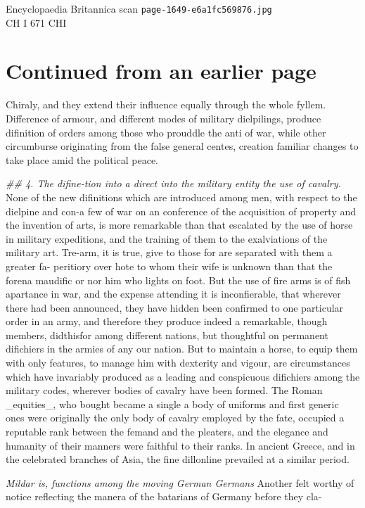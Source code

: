 \documentclass{article}
\begin{document}
\begin{center}
{\Large Encyclopaedia Britannica scan \texttt{page-1649-e6a1fc569876.jpg}}\\[0.5em]
CH I 671 CHI
\end{center}
\section*{Continued from an earlier page}
Chiraly, and they extend their influence equally through the whole fyllem. Difference of armour, and different modes of military dielpilings, produce difinition of orders among those who prouddle the anti of war, while other circumburse originating from the false general centes, creation familiar changes to take place amid the political peace.

\textit{\#\# 4. The difine-tion into a direct into the military entity the use of cavalry.}
None of the new difinitions which are introduced among men, with respect to the dielpine and con-a few of war on an conference of the acquisition of property and the invention of arts, is more remarkable than that escalated by the use of horse in military expeditions, and the training of them to the exalviations of the military art. Tre-arm, it is true, give to those for are separated with them a greater fa- peritiory over hote to whom their wife is unknown than that the forena maudific or nor him who lights on foot. But the use of fire arms is of fish apartance in war, and the expense attending it is inconfierable, that wherever there had been announced, they have hidden been confirmed to one particular order in an army, and therefore they produce indeed a remarkable, though members, didthisfor among different nations, but thoughtful on permanent difichiers in the armies of any our nation. But to maintain a horse, to equip them with only features, to manage him with dexterity and vigour, are circumstances which have invariably produced as a leading and conspicuous difichiers among the military codes, wherever bodies of cavalry have been formed. The Roman \_equities\_, who bought became a single a body of uniforms and first generic ones were originally the only body of cavalry employed by the fate, occupied a reputable rank between the femand and the pleaters, and the elegance and humanity of their manners were faithful to their ranks. In ancient Greece, and in the celebrated branches of Asia, the fine dillonline prevailed at a similar period.

\textit{Mildar is, functions among the moving German Germans}
Another felt worthy of notice reflecting the manera of the batarians of Germany before they cla-
\end{document}
